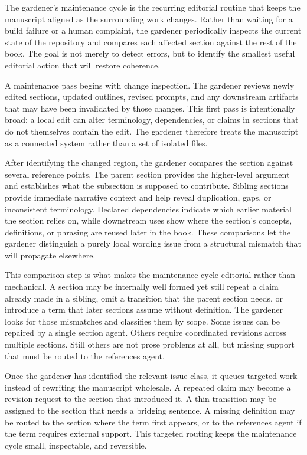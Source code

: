 The gardener's maintenance cycle is the recurring editorial routine that keeps the manuscript aligned as the surrounding work changes. Rather than waiting for a build failure or a human complaint, the gardener periodically inspects the current state of the repository and compares each affected section against the rest of the book. The goal is not merely to detect errors, but to identify the smallest useful editorial action that will restore coherence.

A maintenance pass begins with change inspection. The gardener reviews newly edited sections, updated outlines, revised prompts, and any downstream artifacts that may have been invalidated by those changes. This first pass is intentionally broad: a local edit can alter terminology, dependencies, or claims in sections that do not themselves contain the edit. The gardener therefore treats the manuscript as a connected system rather than a set of isolated files.

After identifying the changed region, the gardener compares the section against several reference points. The parent section provides the higher-level argument and establishes what the subsection is supposed to contribute. Sibling sections provide immediate narrative context and help reveal duplication, gaps, or inconsistent terminology. Declared dependencies indicate which earlier material the section relies on, while downstream uses show where the section's concepts, definitions, or phrasing are reused later in the book. These comparisons let the gardener distinguish a purely local wording issue from a structural mismatch that will propagate elsewhere.

This comparison step is what makes the maintenance cycle editorial rather than mechanical. A section may be internally well formed yet still repeat a claim already made in a sibling, omit a transition that the parent section needs, or introduce a term that later sections assume without definition. The gardener looks for those mismatches and classifies them by scope. Some issues can be repaired by a single section agent. Others require coordinated revisions across multiple sections. Still others are not prose problems at all, but missing support that must be routed to the references agent.

Once the gardener has identified the relevant issue class, it queues targeted work instead of rewriting the manuscript wholesale. A repeated claim may become a revision request to the section that introduced it. A thin transition may be assigned to the section that needs a bridging sentence. A missing definition may be routed to the section where the term first appears, or to the references agent if the term requires external support. This targeted routing keeps the maintenance cycle small, inspectable, and reversible.

